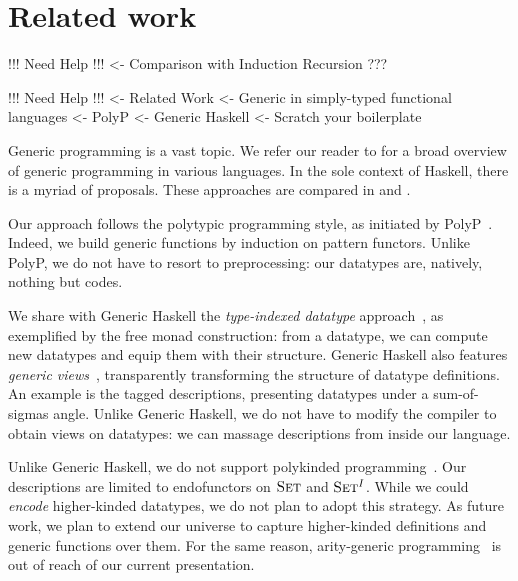 \section{Related work}


\begin{wstructure}
!!! Need Help !!!
<- Comparison with Induction Recursion
    ???
\end{wstructure}


\begin{wstructure}
!!! Need Help !!!
<- Related Work
    <- Generic in simply-typed functional languages
        <- PolyP \cite{jansson:polyp}
        <- Generic Haskell \cite{hinze:generic-haskell}
        <- Scratch your boilerplate \cite{spj:syb}
\end{wstructure}

Generic programming is a vast topic. We refer our reader to
\citet{garcia:generic-comparative-study} for a broad overview of
generic programming in various languages. In the sole context of
Haskell, there is a myriad of proposals. These approaches are compared
in \citet{hinze:generic-approach-comparative} and
\citet{rodriguez:generic-libs-comparative}.

Our approach follows the polytypic programming style, as initiated
by PolyP~\cite{jansson:polyp}. Indeed, we build generic functions by
induction on pattern functors. Unlike PolyP, we do not have to resort
to preprocessing: our datatypes are, natively, nothing but codes.

We share with Generic Haskell the \emph{type-indexed datatype}
approach~\cite{hinze:generic-haskell}, as exemplified by the free
monad construction: from a datatype, we can compute new datatypes and
equip them with their structure. Generic Haskell also features
\emph{generic views}~\cite{holdermans:generic-view}, transparently
transforming the structure of datatype definitions. An example is the
tagged descriptions, presenting datatypes under a sum-of-sigmas
angle. Unlike Generic Haskell, we do not have to modify the compiler
to obtain views on datatypes: we can massage descriptions from inside
our language.

Unlike Generic Haskell, we do not support polykinded
programming~\cite{hinze:polytypic-polykinded}. Our descriptions are
limited to endofunctors on $\Set$ and $\Set^I$. While we could
\emph{encode} higher-kinded datatypes, we do not plan to adopt this
strategy. As future work, we plan to extend our universe to capture
higher-kinded definitions and generic functions over them. For the
same reason, arity-generic programming~\cite{weirich:arity-generic} is
out of reach of our current presentation.

